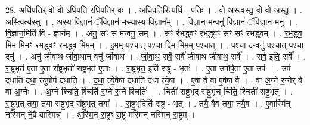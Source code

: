 \documentclass[17pt]{extarticle}
\begin{document}
28. अधि॑पतिर् वो॒ वो ऽधि॑पति॒ रधि॑पतिर् वः । . अधि॑पति॒रित्यधि॑ - प॒तिः॒ । . वो॒ अ॒स्त्व॒स्तु॒ वो॒ वो॒ अ॒स्तु॒ । . अ॒स्त्वित्य॑स्तु । . अ॒स्य वि॒ज्ञानं॑ ॅवि॒ज्ञान॑ म॒स्यास्य वि॒ज्ञान᳚म् । . वि॒ज्ञान॒ मन्वनु॑ वि॒ज्ञानं॑ ॅवि॒ज्ञान॒ मनु॑ । . वि॒ज्ञान॒मिति॑ वि - ज्ञान᳚म् । . अनु॒ सꣳ स मन्वनु॒ सम् । . सꣳ र॑भद्ध्वꣳ रभद्ध्वꣳ॒॒ सꣳ सꣳ र॑भद्ध्वम् । . र॒भ॒द्ध्व॒ मि॒म मि॒मꣳ र॑भद्ध्वꣳ रभद्ध्व मि॒मम् । . इ॒मम् प॒श्चात् प॒श्चा दि॒म मि॒मम् प॒श्चात् । . प॒श्चा दन्वनु॑ प॒श्चात् प॒श्चा दनु॑ । . अनु॑ जीवाथ जीवा॒थान् वनु॑ जीवाथ । . जी॒वा॒थ॒ सर्वे॒ सर्वे॑ जीवाथ जीवाथ॒ सर्वे᳚ । . सर्व॒ इति॒ सर्वे᳚ । . रा॒ष्ट्र॒भृत॑ ए॒ता ए॒ता रा᳚ष्ट्र॒भृतो॑ राष्ट्र॒भृत॑ ए॒ताः । . रा॒ष्ट्र॒भृत॒ इति॑ राष्ट्र - भृतः॑ । . ए॒ता उपोपै॒ता ए॒ता उप॑ । . उप॑ दधाति दधा॒ त्युपोप॑ दधाति । . द॒धा॒ त्ये॒षैषा द॑धाति दधा त्ये॒षा । . ए॒षा वै वा ए॒षैषा वै । . वा अ॒ग्ने र॒ग्नेर् वै वा अ॒ग्नेः । . अ॒ग्ने श्चिति॒ श्चिति॑ र॒ग्ने र॒ग्ने श्चितिः॑ । . चिती॑ राष्ट्र॒भृद् रा᳚ष्ट्र॒भृच् चिति॒ श्चिती॑ राष्ट्र॒भृत् । . रा॒ष्ट्र॒भृत् तया॒ तया॑ राष्ट्र॒भृद् रा᳚ष्ट्र॒भृत् तया᳚ । . रा॒ष्ट्र॒भृदिति॑ राष्ट्र - भृत् । . तयै॒ वैव तया॒ तयै॒व । . ए॒वास्मि॑न् नस्मिन् ने॒वै वास्मिन्न्॑ । . अ॒स्मि॒न् रा॒ष्ट्रꣳ रा॒ष्ट्र म॑स्मिन् नस्मिन् रा॒ष्ट्रम् । \newline
\end{document}
